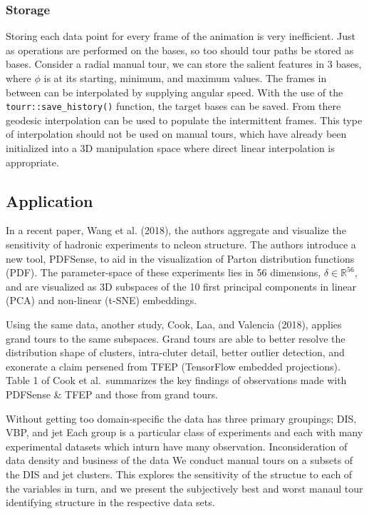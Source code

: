 \hypertarget{storage}{%
\subsubsection{Storage}\label{storage}}

Storing each data point for every frame of the animation is very inefficient. Just as operations are performed on the bases, so too should tour paths be stored as bases. Consider a radial manual tour, we can store the salient features in 3 bases, where \(\phi\) is at its starting, minimum, and maximum values. The frames in between can be interpolated by supplying angular speed. With the use of the \texttt{tourr::save\_history()} function, the target bases can be saved. From there geodesic interpolation can be used to populate the intermittent frames. This type of interpolation should not be used on manual tours, which have already been initialized into a 3D manipulation space where direct linear interpolation is appropriate.

\hypertarget{sec:application}{%
\subsection{Application}\label{sec:application}}

In a recent paper, Wang et al. (2018), the authors aggregate and visualize the sensitivity of hadronic experiments to ncleon structure. The authors introduce a new tool, PDFSense, to aid in the visualization of Parton distribution functions (PDF). The parameter-space of these experiments lies in 56 dimensions, \(\delta \in \mathbb{R}^{56}\), and are visualized as 3D subspaces of the 10 first principal components in linear (PCA) and non-linear (t-SNE) embeddings.

Using the same data, another study, Cook, Laa, and Valencia (2018), applies grand tours to the same subspaces. Grand tours are able to better resolve the distribution shape of clusters, intra-cluter detail, better outlier detection, and exonerate a claim persened from TFEP (TensorFlow embedded projections). Table 1 of Cook et al.~summarizes the key findings of observations made with PDFSense \& TFEP and those from grand tours.

Without getting too domain-specific the data has three primary groupings; DIS, VBP, and jet Each group is a particular class of experiments and each with many experimental datasets which inturn have many observation. Inconsideration of data density and business of the data We conduct manual tours on a subsets of the DIS and jet clusters. This explores the sensitivity of the structue to each of the variables in turn, and we present the subjectively best and worst manaul tour identifying structure in the respective data sets.

